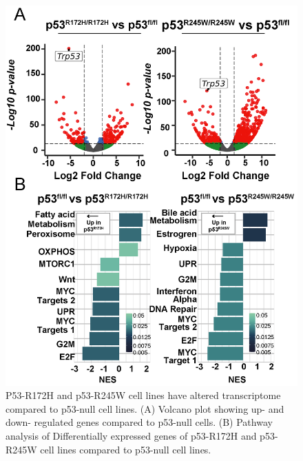 \begin{figure}
\hypertarget{fig:04}{%
\centering
\includegraphics[width=1\textwidth,height=\textheight]{images/p539.png}
\caption{P53-R172H and p53-R245W cell lines have altered transcriptome compared to p53-null cell lines. (A) Volcano plot showing up- and down- regulated genes compared to p53-null cells. (B) Pathway analysis of Differentially expressed genes of p53-R172H and p53-R245W cell lines compared to p53-null cell lines.}\label{fig:04}
}
\end{figure}

